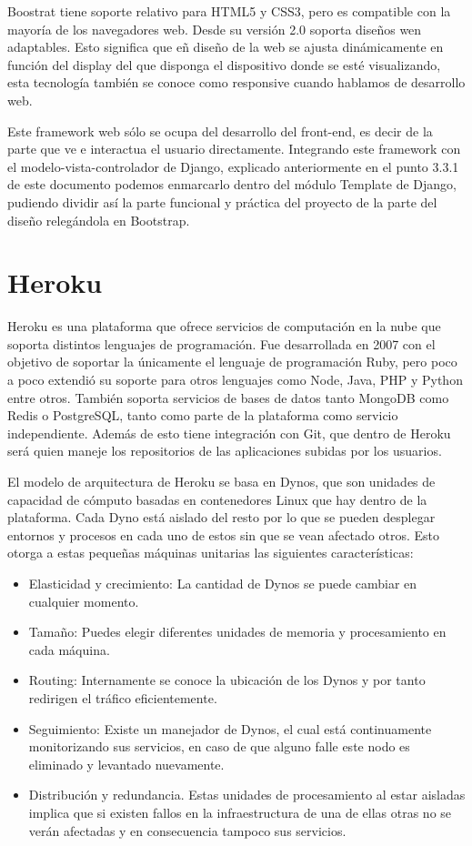 \documentclass[a4paper, 12pt]{book}
\begin{document}
Boostrat tiene soporte relativo para HTML5 y CSS3, pero es compatible con la mayoría de los navegadores web. Desde su versión 2.0 soporta diseños wen adaptables. Esto significa que eñ diseño de la web se ajusta dinámicamente en función del display del que disponga el dispositivo donde se esté visualizando, esta tecnología también se conoce como responsive cuando hablamos de desarrollo web. 

Este framework web sólo se ocupa del desarrollo del front-end, es decir de la parte que ve e interactua el usuario directamente. Integrando este framework con el modelo-vista-controlador de Django, explicado anteriormente en el punto 3.3.1 de este documento podemos enmarcarlo dentro del módulo Template de Django, pudiendo dividir así la parte funcional y práctica del proyecto de la parte del diseño relegándola en Bootstrap. 

\section{Heroku}
Heroku es una plataforma que ofrece servicios de computación en la nube que soporta distintos lenguajes de programación. Fue desarrollada en 2007 con el objetivo de soportar la únicamente el lenguaje de programación Ruby, pero poco a poco extendió su soporte para otros lenguajes como Node, Java, PHP y Python entre otros. También soporta servicios de bases de datos tanto MongoDB como Redis o PostgreSQL, tanto como parte de la plataforma como servicio independiente. Además de esto tiene integración con Git, que dentro de Heroku será quien maneje los repositorios de las aplicaciones subidas por los usuarios. 

El modelo de arquitectura de Heroku se basa en Dynos, que son unidades de capacidad de cómputo basadas en contenedores Linux que hay dentro de la plataforma. Cada Dyno está aislado del resto por lo que se pueden desplegar entornos y procesos en cada uno de estos sin que se vean afectado otros. Esto otorga a estas pequeñas máquinas unitarias las siguientes características: 
\begin{itemize}
	\item Elasticidad y crecimiento: La cantidad de Dynos se puede cambiar en cualquier momento. 
	\item Tamaño: Puedes elegir diferentes unidades de memoria y procesamiento en cada máquina. 
	\item Routing: Internamente se conoce la ubicación de los Dynos y por tanto redirigen el tráfico eficientemente. 
	\item Seguimiento: Existe un manejador de Dynos, el cual está continuamente monitorizando sus servicios, en caso de que alguno falle este nodo es eliminado y levantado nuevamente. 
	\item Distribución y redundancia. Estas unidades de procesamiento al estar aisladas implica que si existen fallos en la infraestructura de una de ellas otras no se verán afectadas y en consecuencia tampoco sus servicios. 	
\end{itemize}
\end{document}
